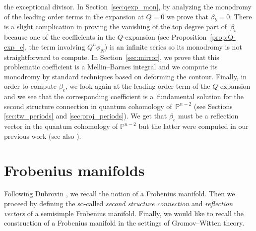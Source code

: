 \documentclass[pdftex]{sigma}
\numberwithin{equation}{section}
\begin{document}
the exceptional divisor. In Section~\ref{sec:qexp_mon}, by analyzing
the monodromy of the leading order terms in the expansion at $Q=0$ we
prove that $\beta_b=0$. There is a slight complication in proving the
vanishing of the top degree part of~$\beta_b$ because one of the
coefficients in the $Q$-expansion (see Proposition~\ref{prop:Q-exp_e},
the term involving $Q^n\phi_N$) is an infinite series so its monodromy
is not straightforward to compute. In Section~\ref{sec:mirror}, we
prove that this problematic coefficient is a Mellin--Barnes integral
and we compute its monodromy by standard techniques based on deforming
the contour. Finally, in order to compute $\beta_e$, we look again at
the leading order term of the $Q$-expansion and we see that the
corresponding coefficient is a~fundamental solution for the second
structure connection in quantum cohomology of~$\mathbb{P}^{n-2}$ (see
Sections \ref{sec:tw_periods} and \ref{sec:proj_periods}). We get that
$\beta_e$ must be a reflection vector in the quantum cohomology of
$\mathbb{P}^{n-2}$ but the latter were computed in our previous work
\cite{Milanov:p2} (see also \cite{Iritani:gamma_structure}).




\section{Frobenius manifolds}\label{sec:frobenius_manifolds}





Following Dubrovin \cite{Du}, we recall the notion of a Frobenius
manifold. Then we proceed by defining the so-called {\em second
 structure connection} and {\em reflection vectors} of a semisimple
Frobenius manifold. Finally, we would like to recall the construction
of a Frobenius manifold in the settings of Gromov--Witten theory.
\end{document}
